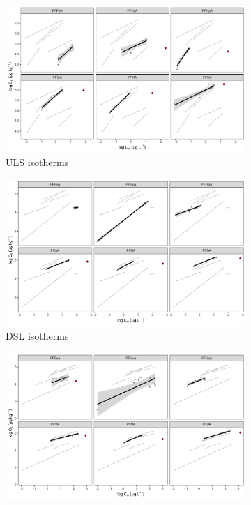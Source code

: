 \begin{figure}
    \centering
        \begin{subfigure}[t]{\linewidth}
            \centering
            \includegraphics[scale=0.6]{R/figs/ULS_facet_isotherm.pdf}
            \caption{ULS isotherms}
            \label{fig:ULS_isotherm}
        \end{subfigure}
        \begin{subfigure}[]{\linewidth}
            \centering
            \includegraphics[scale=0.6]{R/figs/DSL_facet_isotherm.pdf}
            \caption{DSL isotherms}
            \label{fig:DSL_isotherm}
        \end{subfigure}   
        \begin{subfigure}[]{\linewidth}
            \centering
            \includegraphics[scale=0.4]{R/figs/CWC_facet_isotherm.pdf}

\end{subfigure}
\end{figure}
